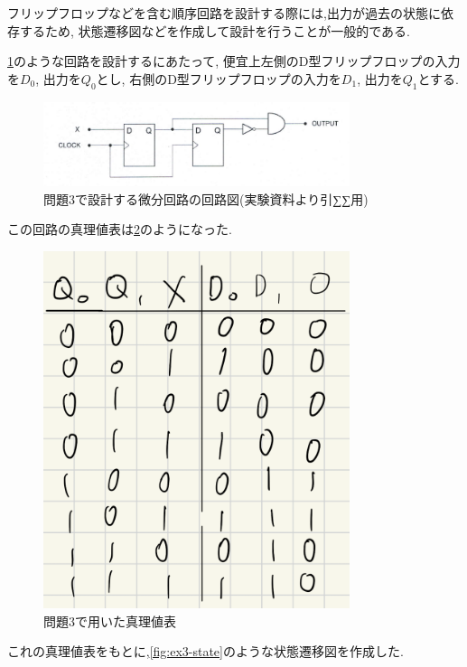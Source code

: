 \documentclass[autodetect-engine, dvi=dvipdfmx, 10pt, a4paper, ja=standard]{bxjsarticle}
\begin{document}
フリップフロップなどを含む順序回路を設計する際には,出力が過去の状態に依存するため,
状態遷移図などを作成して設計を行うことが一般的である.

\ref{fig:ex3}のような回路を設計するにあたって,
便宜上左側のD型フリップフロップの入力を$D_0$, 出力を$Q_0$とし,
右側のD型フリップフロップの入力を$D_1$, 出力を$Q_1$とする.

\begin{figure}[htbp]
	\centering
	\includegraphics[width=0.8\textwidth]{asset/ex3_notebook.png}
	\caption{問題3で設計する微分回路の回路図(実験資料より引∑∑用)}
	\label{fig:ex3}
\end{figure}

この回路の真理値表は\ref{fig:ex3-tf}のようになった.

\begin{figure}[H]
	\centering
	\includegraphics[width=0.8\textwidth]{asset/ex3_tf.png}
	\caption{問題3で用いた真理値表}
	\label{fig:ex3-tf}
\end{figure}

これの真理値表をもとに,\ref{fig:ex3-state}のような状態遷移図を作成した.
\end{document}
